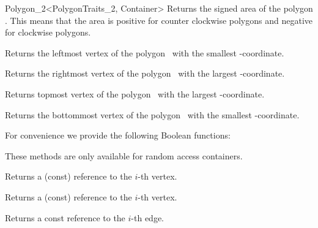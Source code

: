 \begin{ccRefClass}{Polygon_2<PolygonTraits_2, Container>}
    { Returns the signed area of the polygon \ccVar. This means that the area is
      positive for counter clockwise polygons and negative for clockwise polygons.
    }
      
    { Returns the leftmost vertex of the polygon \ccVar\ with the smallest
     -coordinate. }
    
    { Returns the rightmost vertex of the polygon \ccVar\ with the largest
     -coordinate. }
    
    { Returns topmost vertex of the polygon \ccVar\ with the largest
     -coordinate. }
    
    { Returns the bottommost vertex of the polygon \ccVar\ with the smallest
     -coordinate. }
    
For convenience we provide the following Boolean functions:    

    {}

\ccGlue
{}
    {}

    {}

\ccGlue
{}
    {}

\ccGlue
{}
    {}

\ccGlue
{}
    {}
  
\ccGlue
{}
    {}

\ccGlue
{}
    {}

These methods are only available for random access containers.

    { Returns a (const) reference to the $i$-th vertex. }

    { Returns a (const) reference to the $i$-th vertex. }

    { Returns a const reference to the $i$-th edge. }


\end{ccRefClass}
